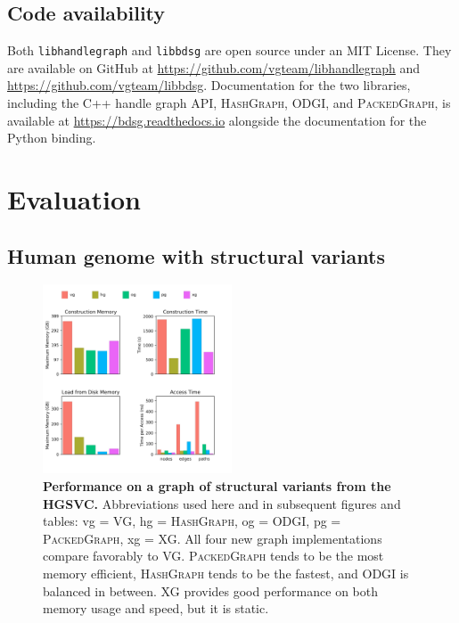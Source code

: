 \documentclass[11pt]{ucthesis}
\begin{document}
\subsection{Code availability}

Both \texttt{libhandlegraph} and \texttt{libbdsg} are open source under an MIT License.
They are available on GitHub at \url{https://github.com/vgteam/libhandlegraph} and \url{https://github.com/vgteam/libbdsg}.
Documentation for the two libraries, including the C++ handle graph API, \textsc{HashGraph}, \textsc{ODGI}, and \textsc{PackedGraph}, is available at \url{https://bdsg.readthedocs.io} alongside the documentation for the Python binding.


\section{Evaluation}

\subsection{Human genome with structural variants}

\begin{figure}
	\begin{center}
		\includegraphics[width=0.5\textwidth]{handlefigures/HGSVC_sorted_gfa.png}
	\end{center}
	\caption{{\label{fig:hgsvc}
        \textbf{Performance on a graph of structural variants from the HGSVC.}
        Abbreviations used here and in subsequent figures and tables: vg = \textsc{VG}, hg = \textsc{HashGraph}, og = \textsc{ODGI}, pg = \textsc{PackedGraph}, xg = \textsc{XG}.
        All four new graph implementations compare favorably to \textsc{VG}.
        \textsc{PackedGraph} tends to be the most memory efficient, \textsc{HashGraph} tends to be the fastest, and \textsc{ODGI} is balanced in between.
        \textsc{XG} provides good performance on both memory usage and speed, but it is static.
        }
      }
\end{figure}
\end{document}
